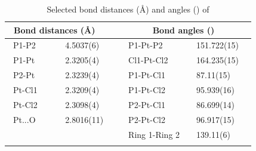 \begin{table}[ht]
\caption[Selected bond distances (\AA) and angles (\degrees) of \ce{[Pt(\tButhixantphos)Cl2]}]{Selected bond distances (\AA) and angles (\degrees) of \ce{[Pt(\tButhixantphos)Cl2]}}
\vspace{1em}
\label{table:crystalthixantphosplatinumdichloride:lengths}
\small
\begin{center}
\begin{tabular}{l l l l}
	\toprule
	\multicolumn{2}{l}{\bfseries{~Bond distances (\si{\angstrom})}} & \multicolumn{2}{c}{\bfseries{Bond angles (\degrees)}} \\
	\midrule		
	~P1-P2		~~&~~4.5037(6)~~	&~~P1-Pt-P2			&~~151.722(15)~~	\\	
	~P1-Pt		~~&~~2.3205(4)~~	&~~Cl1-Pt-Cl2			&~~164.235(15)~~	\\
	~P2-Pt		~~&~~2.3239(4)~~	&~~P1-Pt-Cl1			&~~87.11(15)~~	\\
	~Pt-Cl1		~~&~~2.3209(4)~~	&~~P1-Pt-Cl2			&~~95.939(16)~~	\\
	~Pt-Cl2		~~&~~2.3098(4)~~	&~~P2-Pt-Cl1			&~~86.699(14)~~	\\
	~Pt...O		~~&~~2.8016(11)~~	&~~P2-Pt-Cl2			&~~96.917(15)~~	\\
	~				&			&~~Ring 1-Ring 2		&~~139.11(6)~~	\\
	\bottomrule{}
\end{tabular}
\end{center}
\end{table}

